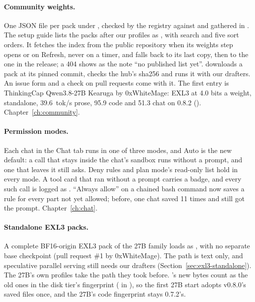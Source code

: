 \paragraph{Community weights.} One JSON file per pack under , checked by the registry against  and gathered in . The setup guide lists the packs after our profiles as , with search and five sort orders. It fetches the index from the public repository when its weights step opens or on Refresh, never on a timer, and falls back to its last copy, then to the one in the release; a 404 shows as the note \enquote{no published list yet}.  downloads a pack at its pinned commit, checks the hub's sha256 and runs it with our drafters. An issue form and a check on pull requests come with it. The first entry is ThinkingCap Qwen3.8-27B Kearuga by 0xWhiteMage: EXL3 at 4.0 bits a weight, standalone, 39.6~tok/s prose, 95.9 code and 51.3 chat on 0.8.2 (\measured). Chapter~\ref{ch:community}.

\paragraph{Permission modes.} Each chat in the Chat tab runs in one of three modes, and Auto is the new default: a call that stays inside the chat's sandbox runs without a prompt, and one that leaves it still asks. Deny rules and plan mode's read-only list hold in every mode. A tool card that ran without a prompt carries a badge, and every such call is logged as . \enquote{Always allow} on a chained bash command now saves a rule for every part not yet allowed; before, one chat saved  11 times and still got the prompt. Chapter~\ref{ch:chat}.

\paragraph{Standalone EXL3 packs.} A complete BF16-origin  EXL3 pack of the 27B family loads as , with no separate base checkpoint (pull request \#1 by 0xWhiteMage). The path is text only, and speculative parallel serving still needs our drafters (Section~\ref{sec:exl3-standalone}). The 27B's own profiles take the path they took before. 's new bytes count as the old ones in the disk tier's fingerprint ( in ), so the first 27B start adopts v0.8.0's saved files once, and the 27B's code fingerprint stays 0.7.2's.

